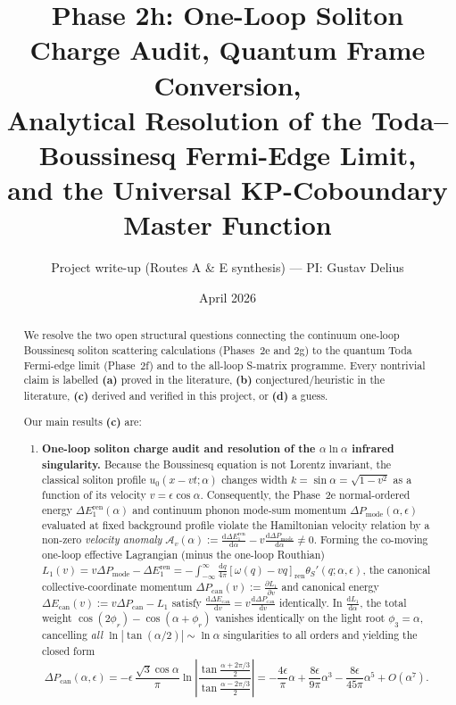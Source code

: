 \documentclass[11pt,a4paper]{article}
\title{\textbf{Phase 2h: One-Loop Soliton Charge Audit, Quantum Frame Conversion,\\
Analytical Resolution of the Toda--Boussinesq Fermi-Edge Limit,\\
and the Universal KP-Coboundary Master Function}}
\author{Project write-up (Routes A \& E synthesis) --- PI: Gustav Delius}
\date{April 2026}
\newcommand{\dd}{\mathrm{d}}
\begin{document}
\maketitle

\begin{abstract}
We resolve the two open structural questions connecting the continuum one-loop
Boussinesq soliton scattering calculations (Phases~2e and 2g) to the quantum Toda
Fermi-edge limit (Phase~2f) and to the all-loop S-matrix programme. Every
nontrivial claim is labelled \textbf{(a)} proved in the literature,
\textbf{(b)} conjectured/heuristic in the literature, \textbf{(c)} derived and
verified in this project, or \textbf{(d)} a guess.

Our main results \textbf{(c)} are:
\begin{enumerate}
\item \textbf{One-loop soliton charge audit and resolution of the $\alpha\ln\alpha$ infrared singularity.}
Because the Boussinesq equation is not Lorentz invariant, the classical soliton
profile $u_0(x-vt;\alpha)$ changes width $k = \sin\alpha = \sqrt{1-v^2}$ as a
function of its velocity $v = \epsilon\cos\alpha$. Consequently, the Phase~2e
normal-ordered energy $\Delta E_1^{\mathrm{ren}}(\alpha)$ and continuum phonon
mode-sum momentum $\Delta P_{\mathrm{mode}}(\alpha,\epsilon)$ evaluated at fixed
background profile violate the Hamiltonian velocity relation by a non-zero
\emph{velocity anomaly}
$\mathcal{A}_v(\alpha) := \frac{\dd\Delta E_1^{\mathrm{ren}}}{\dd\alpha} - v\frac{\dd\Delta P_{\mathrm{mode}}}{\dd\alpha} \neq 0$.
Forming the co-moving one-loop effective Lagrangian (minus the one-loop Routhian)
$L_1(v) = v\Delta P_{\mathrm{mode}} - \Delta E_1^{\mathrm{ren}} = -\int_{-\infty}^\infty \frac{\dd q}{4\pi}[\omega(q)-vq]_{\mathrm{ren}}\theta_S'(q;\alpha,\epsilon)$,
the canonical collective-coordinate momentum
$\Delta P_{\mathrm{can}}(v) := \frac{\partial L_1}{\partial v}$ and canonical
energy $\Delta E_{\mathrm{can}}(v) := v\Delta P_{\mathrm{can}} - L_1$ satisfy
$\frac{\dd\Delta E_{\mathrm{can}}}{\dd v} = v\frac{\dd\Delta P_{\mathrm{can}}}{\dd v}$
identically. In $\frac{\dd L_1}{\dd\alpha}$, the total weight
$\cos(2\phi_r) - \cos(\alpha+\phi_r)$ vanishes identically on the light root
$\phi_3 = \alpha$, cancelling \emph{all} $\ln|\tan(\alpha/2)| \sim \ln\alpha$
singularities to all orders and yielding the closed form
\[
  \Delta P_{\mathrm{can}}(\alpha,\epsilon)
  = -\epsilon\,\frac{\sqrt{3}\cos\alpha}{\pi}\ln\!\left|\frac{\tan\frac{\alpha+2\pi/3}{2}}{\tan\frac{\alpha-2\pi/3}{2}}\right|
  = -\frac{4\epsilon}{\pi}\alpha + \frac{8\epsilon}{9\pi}\alpha^3 - \frac{8\epsilon}{45\pi}\alpha^5 + O(\alpha^7).
\]
\end{enumerate}
\end{abstract}
\end{document}
